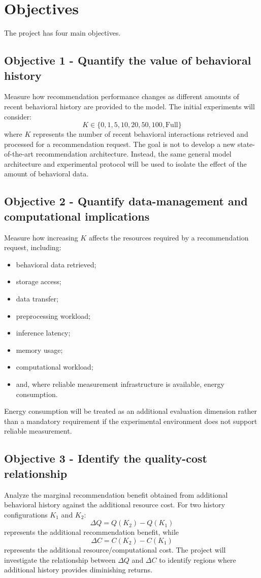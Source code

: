 \documentclass[12pt,a4paper]{article}
\begin{document}
\section{Objectives}

The project has four main objectives.

\subsection*{Objective 1 - Quantify the value of behavioral history}
Measure how recommendation performance changes as different amounts of recent behavioral history are provided to the model. The initial experiments will consider:
\[ K \in \{0, 1, 5, 10, 20, 50, 100, \text{Full}\} \]
where $K$ represents the number of recent behavioral interactions retrieved and processed for a recommendation request. 
The goal is not to develop a new state-of-the-art recommendation architecture. Instead, the same general model architecture and experimental protocol will be used to isolate the effect of the amount of behavioral data.

\subsection*{Objective 2 - Quantify data-management and computational implications}
Measure how increasing $K$ affects the resources required by a recommendation request, including:
\begin{itemize}
    \item behavioral data retrieved;
    \item storage access;
    \item data transfer;
    \item preprocessing workload;
    \item inference latency;
    \item memory usage;
    \item computational workload;
    \item and, where reliable measurement infrastructure is available, energy consumption.
\end{itemize}
Energy consumption will be treated as an additional evaluation dimension rather than a mandatory requirement if the experimental environment does not support reliable measurement.

\subsection*{Objective 3 - Identify the quality-cost relationship}
Analyze the marginal recommendation benefit obtained from additional behavioral history against the additional resource cost.
For two history configurations $K_1$ and $K_2$:
\[ \Delta Q = Q(K_2) - Q(K_1) \]
represents the additional recommendation benefit, while
\[ \Delta C = C(K_2) - C(K_1) \]
represents the additional resource/computational cost.
The project will investigate the relationship between $\Delta Q$ and $\Delta C$ to identify regions where additional history provides diminishing returns.
\end{document}
